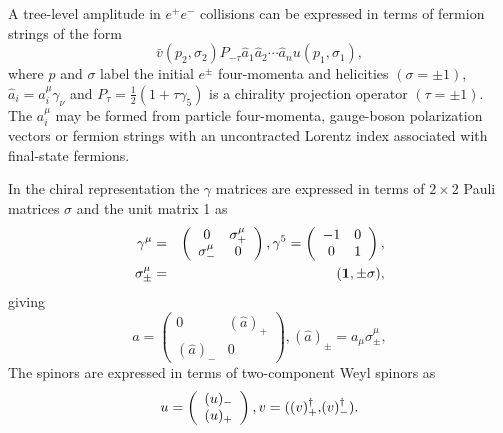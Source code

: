 \documentclass[manuscript]{aastex}
\newcommand{\vdag}{(v)^\dagger}
\begin{document}
A tree-level amplitude in $e^+e^-$ collisions can be expressed in
terms of fermion strings of the form
\begin{equation}
\bar v(p_2,\sigma_2)P_{-\tau}\hat a_1\hat a_2\cdots
\hat a_nu(p_1,\sigma_1) ,
\end{equation}
where $p$ and $\sigma$ label the initial $e^{\pm}$ four-momenta
and helicities $(\sigma = \pm 1)$, $\hat a_i=a^\mu_i\gamma_\nu$
and $P_\tau=\frac{1}{2}(1+\tau\gamma_5)$ is a chirality projection
operator $(\tau = \pm1)$.  The $a^\mu_i$ may be formed from particle
four-momenta, gauge-boson polarization vectors or fermion strings with
an uncontracted Lorentz index associated with final-state fermions.



In the chiral  representation the $\gamma$ matrices are expressed
in terms of $2\times 2$ Pauli matrices $\sigma$ and the unit matrix 1 as
\begin{eqnarray}
\gamma^\mu  & = &
 \left(
\begin{array}{cc}
0 & \sigma^\mu_+ \\
\sigma^\mu_- & 0
\end{array}     \right) ,
 \gamma^5= \left(
\begin{array}{cc}
-1 &   0\\
0 &   1
\end{array}     \right)  , \nonumber \\
\sigma^\mu_{\pm}  & = &   ({\bf 1} ,\pm \sigma) , \nonumber
\end{eqnarray}
giving
\begin{equation}
\hat a= \left(
\begin{array}{cc}
0 & (\hat a)_+\\
(\hat a)_- & 0
\end{array}\right), (\hat a)_\pm=a_\mu\sigma^\mu_\pm ,
\end{equation}
The spinors are expressed in terms of two-component Weyl spinors as
\begin{equation}
u=\left(
\begin{array}{c}
(u)_-\\
(u)_+
\end{array}\right), v={\bf (}\vdag_+{\bf ,}   \vdag_-{\bf )} .
\end{equation}
\end{document}
